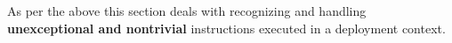 \begin{center}
\end{center}
As per the above this section deals with recognizing and handling \textbf{unexceptional and nontrivial}  instructions executed in a deployment context.

